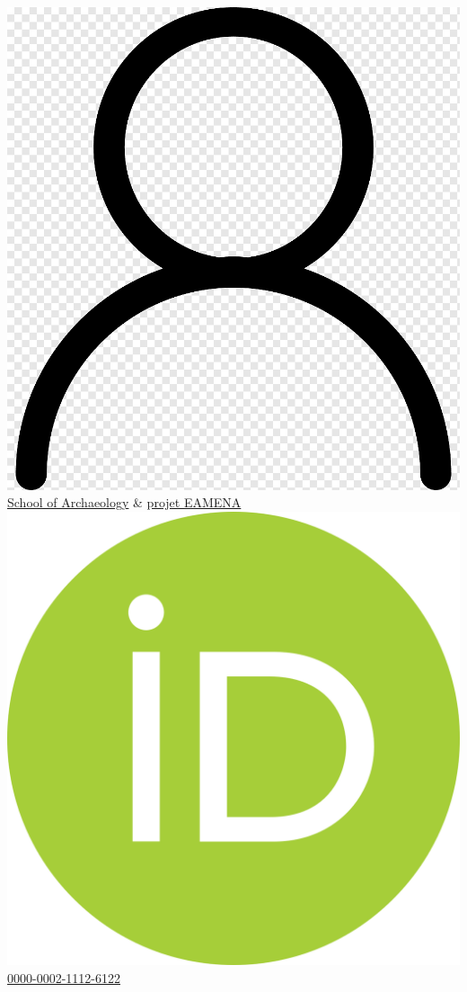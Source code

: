 \documentclass{article}
\begin{document}
\includegraphics[scale=0.010]{webpro} \quad \href{https://archit.web.ox.ac.uk/people/dr-thomas-huet}{School of Archaeology} \& \href{https://eamena.org/people/dr-thomas-huet}{projet EAMENA}\\
\includegraphics[scale=0.007]{lod-orcid} \quad \href{https://orcid.org/0000-0002-1112-6122}{0000-0002-1112-6122} \\
\end{document}
